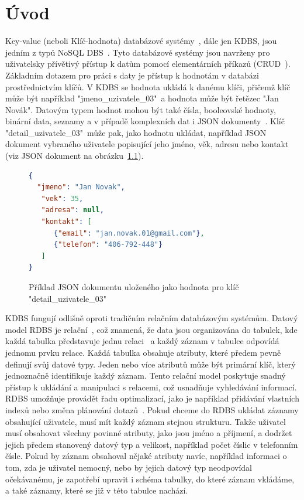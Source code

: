 \documentclass[czech,master,dept460,male,csharp,cpdeclaration]{diploma}
\begin{document}
	
	\MakeTitlePages
	
	\listoffigures
	\listoftables
	
	\chapter{Úvod}
	
	Key-value (neboli Klíč-hodnota) databázové systémy~\cite{amaz-key-value-db, ytb-nosql-db}, dále jen KDBS, jsou jedním z typů NoSQL DBS~\cite{nosql}. Tyto databázové systémy jsou navrženy pro uživatelsky přívětivý přístup k datům pomocí elementárních příkazů (CRUD~\cite{crud}). Základním dotazem pro práci s daty je přístup k hodnotám v databázi prostřednictvím klíčů. V KDBS se hodnota ukládá k danému klíči, přičemž klíč může být například "jmeno\_uzivatele\_03"~a hodnota může být řetězec "Jan Novák". Datovým typem hodnot mohou být také čísla, booleovské hodnoty, binární data, seznamy a v případě komplexních dat i JSON dokumenty~\cite{json}. Klíč "detail\_uzivatele\_03"~může pak, jako hodnotu ukládat, například JSON dokument vybraného uživatele popisující jeho jméno, věk, adresu nebo kontakt (viz JSON dokument na obrázku~\ref{json-hodnota}).
	
	\begin{figure}
	\centering
	\begin{lstlisting}[language=json,firstnumber=1]
{
  "jmeno": "Jan Novak",
   "vek": 35,
   "adresa": null,
   "kontakt": [
      {"email": "jan.novak.01@gmail.com"},
      {"telefon": "406-792-448"}
   ]
}
	\end{lstlisting}
	\caption{Příklad JSON dokumentu uloženého jako hodnota pro klíč "detail\_uzivatele\_03"}
	\label{json-hodnota}
	\end{figure}	
	
	KDBS fungují odlišně oproti tradičním relačním databázovým systémům. Datový model RDBS je relační~\cite{rdbs}, což znamená, že data jsou organizována do tabulek, kde každá tabulka představuje jednu relaci~\cite{relace} a každý záznam v tabulce odpovídá jednomu prvku relace. Každá tabulka obsahuje atributy, které předem pevně definují svůj datové typy. Jeden nebo více atributů může být primární klíč, který jednoznačně identifikuje každý záznam. Tento relační model poskytuje snadný přístup k ukládání a manipulaci s relacemi, což usnadňuje vyhledávání informací. RDBS umožňuje provádět řadu optimalizací, jako je například přidávání vlastních indexů nebo změna plánování dotazů~\cite{rdbs-optimalizace}. Pokud chceme do RDBS ukládat záznamy obsahující uživatele, musí mít každý záznam stejnou strukturu. Takže uživatel musí obsahovat všechny povinné atributy, jako jsou jméno a příjmení, a dodržet jejich předem stanovený datový typ a velikost, například počet číslic v telefonním čísle. Pokud by záznam obsahoval nějaké atributy navíc, například informaci o tom, zda je uživatel nemocný, nebo by jejich datový typ neodpovídal očekávanému, je zapotřebí upravit i schéma tabulky, do které záznam vkládáme, a také záznamy, které se již v této tabulce nachází.
	
\end{document}
